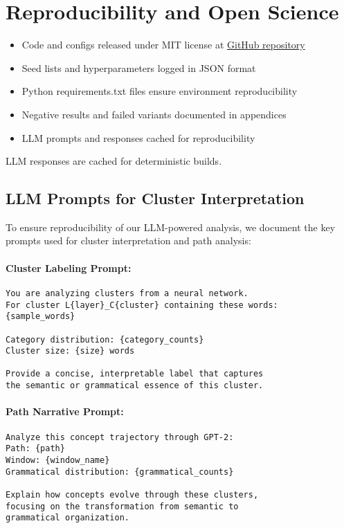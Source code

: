 \section{Reproducibility and Open Science}

\begin{itemize}
    \item Code and configs released under MIT license at \href{https://github.com/AndrewSmigaj/conceptual-trajectory-analysis-LLM-intereptability-framework/}{GitHub repository}
    \item Seed lists and hyperparameters logged in JSON format
    \item Python requirements.txt files ensure environment reproducibility
    \item Negative results and failed variants documented in appendices
    \item LLM prompts and responses cached for reproducibility
\end{itemize}

LLM responses are cached for deterministic builds.

\subsection{LLM Prompts for Cluster Interpretation}

To ensure reproducibility of our LLM-powered analysis, we document the key prompts used for cluster interpretation and path analysis:

\paragraph{Cluster Labeling Prompt:}
\begin{verbatim}
You are analyzing clusters from a neural network. 
For cluster L{layer}_C{cluster} containing these words:
{sample_words}

Category distribution: {category_counts}
Cluster size: {size} words

Provide a concise, interpretable label that captures 
the semantic or grammatical essence of this cluster.
\end{verbatim}

\paragraph{Path Narrative Prompt:}
\begin{verbatim}
Analyze this concept trajectory through GPT-2:
Path: {path}
Window: {window_name}
Grammatical distribution: {grammatical_counts}

Explain how concepts evolve through these clusters,
focusing on the transformation from semantic to 
grammatical organization.
\end{verbatim}

